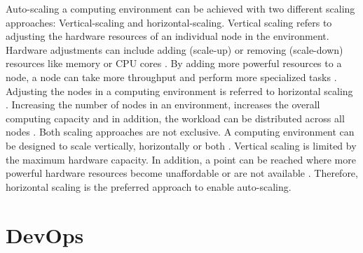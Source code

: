 Auto-scaling a computing environment can be achieved with two different scaling approaches: Vertical-scaling and horizontal-scaling.
Vertical scaling refers to adjusting the hardware resources of an individual node in the environment. Hardware adjustments can include adding (scale-up) or removing (scale-down) resources like memory or CPU cores \cite{Wilder2012CloudPatterns}. By adding more powerful resources to a node, a node can take more throughput and perform more specialized tasks \cite{Abbott2015ScalabilityArt}.
Adjusting the nodes in a computing environment is referred to horizontal scaling \cite{Wilder2012CloudPatterns}. Increasing the number of nodes in an environment, increases the overall computing capacity and in addition, the workload can be distributed across all nodes \cite{Wilder2012CloudPatterns, Abbott2015ScalabilityArt}.
Both scaling approaches are not exclusive. A computing environment can be designed to scale vertically, horizontally or both \cite{Wilder2012CloudPatterns}.
Vertical scaling is limited by the maximum hardware capacity. In addition, a point can be reached where more powerful hardware resources become unaffordable or are not available \cite{Abbot2011ScalabilityRules}.  Therefore, horizontal scaling is the preferred approach to enable auto-scaling.


\section{DevOps}






%


